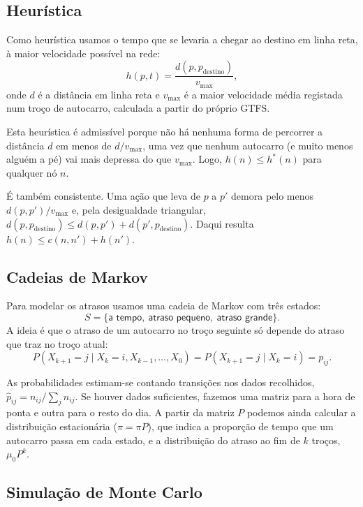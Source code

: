 \documentclass[11pt,a4paper]{article}
\begin{document}
\subsection{Heurística}

Como heurística usamos o tempo que se levaria a chegar ao destino em
linha reta, à maior velocidade possível na rede:
\[
  h(p, t) = \frac{d(p, p_{\text{destino}})}{v_{\max}},
\]
onde $d$ é a distância em linha reta e $v_{\max}$ é a maior velocidade
média registada num troço de autocarro, calculada a partir do próprio
GTFS.

Esta heurística é admissível porque não há nenhuma forma de percorrer a
distância $d$ em menos de $d / v_{\max}$, uma vez que nenhum autocarro
(e muito menos alguém a pé) vai mais depressa do que $v_{\max}$. Logo,
$h(n) \le h^{*}(n)$ para qualquer nó $n$.

É também consistente. Uma ação que leva de $p$ a $p'$ demora pelo menos
$d(p,p')/v_{\max}$ e, pela desigualdade triangular,
$d(p,p_{\text{destino}}) \le d(p,p') + d(p',p_{\text{destino}})$. Daqui
resulta $h(n) \le c(n,n') + h(n')$.


\subsection{Cadeias de Markov}

Para modelar os atrasos usamos uma cadeia de Markov com três estados:
\[
  S = \{\textsf{a tempo},\ \textsf{atraso pequeno},\ \textsf{atraso grande}\}.
\]
A ideia é que o atraso de um autocarro no troço seguinte só depende do
atraso que traz no troço atual:
\[
  P(X_{k+1} = j \mid X_k = i, X_{k-1}, \dots, X_0) = P(X_{k+1} = j \mid X_k = i) = p_{ij}.
\]

As probabilidades estimam-se contando transições nos dados recolhidos,
$\hat{p}_{ij} = n_{ij} / \sum_{j} n_{ij}$. Se houver dados suficientes,
fazemos uma matriz para a hora de ponta e outra para o resto do dia. A
partir da matriz $P$ podemos ainda calcular a distribuição estacionária
($\pi = \pi P$), que indica a proporção de tempo que um autocarro passa
em cada estado, e a distribuição do atraso ao fim de $k$ troços,
$\mu_0 P^{k}$.

\subsection{Simulação de Monte Carlo}
\end{document}

